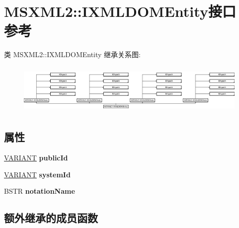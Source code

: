 \hypertarget{interface_m_s_x_m_l2_1_1_i_x_m_l_d_o_m_entity}{}\section{M\+S\+X\+M\+L2\+:\+:I\+X\+M\+L\+D\+O\+M\+Entity接口 参考}
\label{interface_m_s_x_m_l2_1_1_i_x_m_l_d_o_m_entity}
类 M\+S\+X\+M\+L2\+:\+:I\+X\+M\+L\+D\+O\+M\+Entity 继承关系图\+:\begin{figure}[H]
\begin{center}
\leavevmode
\includegraphics[height=2.470588cm]{interface_m_s_x_m_l2_1_1_i_x_m_l_d_o_m_entity}
\end{center}
\end{figure}
\subsection*{属性}
\begin{DoxyCompactItemize}
\item 
\mbox{\label{interface_m_s_x_m_l2_1_1_i_x_m_l_d_o_m_entity_a04bed9600259fe1ebdf1a430a6372f8d}} 
\hyperlink{structtag_v_a_r_i_a_n_t}{V\+A\+R\+I\+A\+NT} {\bfseries public\+Id}
\item 
\mbox{\label{interface_m_s_x_m_l2_1_1_i_x_m_l_d_o_m_entity_a26c36c3bef3c00914a09cce61a9dba6f}} 
\hyperlink{structtag_v_a_r_i_a_n_t}{V\+A\+R\+I\+A\+NT} {\bfseries system\+Id}
\item 
\mbox{\label{interface_m_s_x_m_l2_1_1_i_x_m_l_d_o_m_entity_a0d717ebd3db20f022365b197cd758b20}} 
B\+S\+TR {\bfseries notation\+Name}
\end{DoxyCompactItemize}
\subsection*{额外继承的成员函数}


